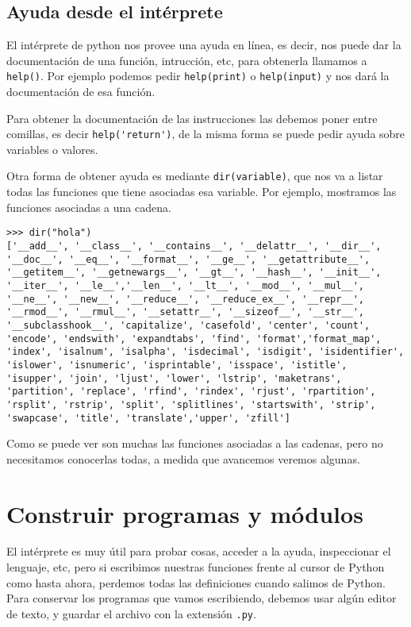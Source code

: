 \subsection{Ayuda desde el intérprete}

El intérprete de python nos provee una ayuda en línea, es decir, nos puede dar
la documentación de una función, intrucción, etc, para
obtenerla llamamos a \lstinline!help()!. Por ejemplo podemos pedir
\lstinline!help(print)! o \lstinline!help(input)! y nos dará la documentación
de esa función.

Para obtener la documentación de las instrucciones las debemos poner entre
comillas, es decir \lstinline!help('return')!, de la misma forma se puede
pedir ayuda sobre variables o valores.

Otra forma de obtener ayuda es mediante \lstinline!dir(variable)!, que nos va a
listar todas las funciones que tiene asociadas esa variable. Por ejemplo,
mostramos las funciones asociadas a una cadena.

\begin{lstlisting}[numbers=none]
>>> dir("hola")
['__add__', '__class__', '__contains__', '__delattr__', '__dir__',
'__doc__', '__eq__', '__format__', '__ge__', '__getattribute__',
'__getitem__', '__getnewargs__', '__gt__', '__hash__', '__init__',
'__iter__', '__le__','__len__', '__lt__', '__mod__', '__mul__',
'__ne__', '__new__', '__reduce__', '__reduce_ex__', '__repr__',
'__rmod__', '__rmul__', '__setattr__', '__sizeof__', '__str__',
'__subclasshook__', 'capitalize', 'casefold', 'center', 'count',
'encode', 'endswith', 'expandtabs', 'find', 'format','format_map',
'index', 'isalnum', 'isalpha', 'isdecimal', 'isdigit', 'isidentifier',
'islower', 'isnumeric', 'isprintable', 'isspace', 'istitle',
'isupper', 'join', 'ljust', 'lower', 'lstrip', 'maketrans',
'partition', 'replace', 'rfind', 'rindex', 'rjust', 'rpartition',
'rsplit', 'rstrip', 'split', 'splitlines', 'startswith', 'strip',
'swapcase', 'title', 'translate','upper', 'zfill']
\end{lstlisting}

Como se puede ver son muchas las funciones asociadas a las cadenas, pero no
necesitamos conocerlas todas, a medida que avancemos veremos algunas.

\section{Construir programas y módulos}

El intérprete es muy útil para probar cosas, acceder a la ayuda,
inspeccionar el lenguaje, etc, pero si escribimos nuestras funciones frente
al cursor de Python como hasta ahora, perdemos todas las definiciones
cuando salimos de Python. Para conservar los programas que vamos
escribiendo, debemos usar algún editor de texto, y guardar el archivo con
la extensión \verb+.py+.

